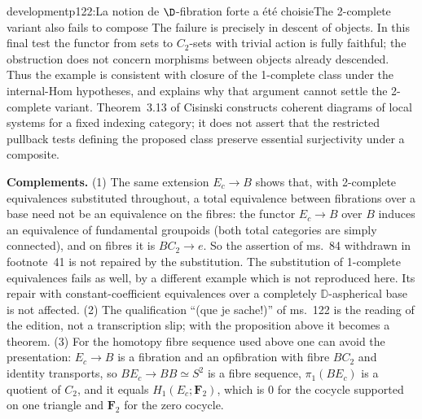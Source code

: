 \begin{dcomment}{development}{p122:La notion de $\D$-fibration forte a été choisie}{The 2-complete variant also fails to compose}
The failure is precisely in descent of objects. In this final test the functor from sets to $C_2$-sets with trivial action is fully faithful; the obstruction does not concern morphisms between objects already descended. Thus the example is consistent with closure of the 1-complete class under the internal-Hom hypotheses, and explains why that argument cannot settle the 2-complete variant. Theorem~3.13 of Cisinski constructs coherent diagrams of local systems for a fixed indexing category; it does not assert that the restricted pullback tests defining the proposed class preserve essential surjectivity under a composite.

\textbf{Complements.}
(1) The same extension $E_c\to B$ shows that, with 2-complete equivalences substituted throughout, a total equivalence between fibrations over a base need not be an equivalence on the fibres: the functor $E_c\to B$ over $B$ induces an equivalence of fundamental groupoids (both total categories are simply connected), and on fibres it is $BC_2\to e$. So the assertion of ms.~84 withdrawn in footnote~41 is not repaired by the substitution. The substitution of 1-complete equivalences fails as well, by a different example which is not reproduced here. Its repair with constant-coefficient equivalences over a completely $\mathbb D$-aspherical base is not affected.
(2) The qualification ``(que je sache!)'' of ms.~122 is the reading of the edition, not a transcription slip; with the proposition above it becomes a theorem.
(3) For the homotopy fibre sequence used above one can avoid the presentation: $E_c\to B$ is a fibration and an opfibration with fibre $BC_2$ and identity transports, so $BE_c\to BB\simeq S^2$ is a fibre sequence, $\pi_1(BE_c)$ is a quotient of $C_2$, and it equals $H_1(E_c;\mathbf F_2)$, which is $0$ for the cocycle supported on one triangle and $\mathbf F_2$ for the zero cocycle.
\end{dcomment}

